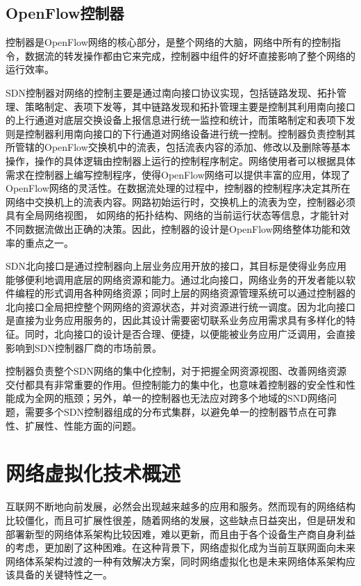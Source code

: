 \subsection{OpenFlow控制器}
控制器是OpenFlow网络的核心部分，是整个网络的大脑，网络中所有的控制指令，数据流的转发操作都由它来完成，控制器中组件的好坏直接影响了整个网络的运行效率。


SDN控制器对网络的控制主要是通过南向接口协议实现，包括链路发现、拓扑管理、策略制定、表项下发等，其中链路发现和拓扑管理主要是控制其利用南向接口的上行通道对底层交换设备上报信息进行统一监控和统计，而策略制定和表项下发则是控制器利用南向接口的下行通道对网络设备进行统一控制。控制器负责控制其所管辖的OpenFlow交换机中的流表，包括流表内容的添加、修改以及删除等基本操作，操作的具体逻辑由控制器上运行的控制程序制定。网络使用者可以根据具体需求在控制器上编写控制程序，使得OpenFlow网络可以提供丰富的应用，体现了 OpenFlow网络的灵活性。在数据流处理的过程中，控制器的控制程序决定其所在网络中交换机上的流表内容。网路初始运行时，交换机上的流表为空，控制器必须具有全局网络视图， 如网络的拓扑结构、网络的当前运行状态等信息，才能针对不同数据流做出正确的决策。因此，控制器的设计是OpenFlow网络整体功能和效率的重点之一。

SDN北向接口是通过控制器向上层业务应用开放的接口\cite{SDN-4}，其目标是使得业务应用能够便利地调用底层的网络资源和能力。通过北向接口，网络业务的开发者能以软件编程的形式调用各种网络资源；同时上层的网络资源管理系统可以通过控制器的北向接口全局把控整个网网络的资源状态，并对资源进行统一调度。因为北向接口是直接为业务应用服务的，因此其设计需要密切联系业务应用需求具有多样化的特征。同时，北向接口的设计是否合理、便捷，以便能被业务应用广泛调用，会直接影响到SDN控制器厂商的市场前景。

控制器负责整个SDN网络的集中化控制，对于把握全网资源视图、改善网络资源交付都具有非常重要的作用。但控制能力的集中化，也意味着控制器的安全性和性能成为全网的瓶颈；另外，单一的控制器也无法应对跨多个地域的SND网络问题，需要多个SDN控制器组成的分布式集群，以避免单一的控制器节点在可靠性、扩展性、性能方面的问题。
\section{网络虚拟化技术概述}
互联网不断地向前发展，必然会出现越来越多的应用和服务。然而现有的网络结构比较僵化，而且可扩展性很差，随着网络的发展，这些缺点日益突出，但是研发和部署新型的网络体系架构比较因难，难以更新，而且由于各个设备生产商自身利益的考虑，更加剧了这种困难。在这种背景下，网络虚拟化成为当前互联网面向未来网络体系架构过渡的一种有效解决方案，同时网络虚拟化也是未来网络体系架构应该具备的关键特性之一。

